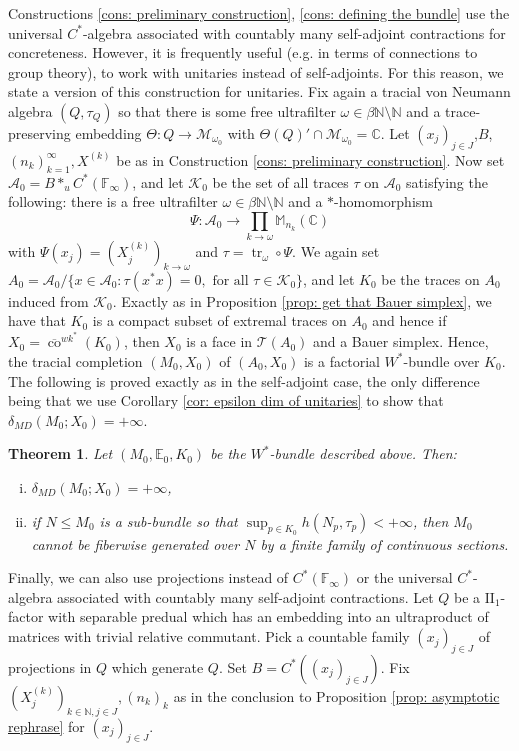 \documentclass[10pt]{amsart}
\newtheorem{thm}{Theorem}[section]
\theoremstyle{definition}
\numberwithin{equation}{section}
\newcommand{\bC}{{\mathbb C}}
\newcommand{\bE}{{\mathbb E}}
\newcommand{\bF}{{\mathbb F}}
\newcommand{\bM}{{\mathbb M}}
\newcommand{\bN}{{\mathbb N}}
\newcommand{\cA}{{\mathcal A}}
\newcommand{\cK}{{\mathcal K}}
\newcommand{\cM}{{\mathcal M}}
\newcommand{\cT}{{\mathcal T}}
\DeclareMathOperator{\tr}{tr}
\DeclareMathOperator{\co}{co}
\begin{document}
Constructions \ref{cons: preliminary construction}, \ref{cons: defining the bundle} use the universal $C^{*}$-algebra associated with countably many self-adjoint contractions for concreteness. However, it is frequently useful (e.g. in terms of connections to group theory), to work with unitaries instead of self-adjoints. For this reason, we state a version of this construction for unitaries. Fix again a tracial von Neumann algebra $(Q,\tau_{Q})$ so that there is some free ultrafilter $\omega\in \beta\bN\setminus\bN$ and a trace-preserving embedding $\Theta\colon Q\to\cM_{\omega_{0}}$ with $\Theta(Q)'\cap \cM_{\omega_{0}}=\bC$. Let $(x_{j})_{j\in J}$,$B$, $(n_{k})_{k=1}^{\infty},X^{(k)}$ be as in Construction \ref{cons: preliminary construction}. Now set $\cA_{0}=B*_{u}C^{*}(\bF_{\infty})$, and let $\cK_{0}$ be the set of all traces $\tau$ on $\cA_{0}$ satisfying the following: there is a free ultrafilter $\omega\in \beta\bN\setminus\bN$ and a $*$-homomorphism
\[\Psi\colon \cA_{0}\to \prod_{k\to\omega}\bM_{n_{k}}(\bC)\]
with $\Psi(x_{j})=(X_{j}^{(k)})_{k\to\omega}$ and $\tau=\tr_{\omega}\circ \Psi$. We again set $A_{0}=\cA_{0}/\{x\in \cA_{0}:\tau(x^{*}x)=0, \text{ for all $\tau\in \cK_{0}$}\}$, and let $K_{0}$ be the traces on $A_{0}$ induced from $\cK_{0}$. Exactly as in Proposition \ref{prop: get that Bauer simplex}, we have that $K_{0}$ is a compact subset of extremal traces on $A_{0}$ and hence if $X_{0}=\overline{\co}^{wk^{*}}(K_{0})$, then $X_{0}$ is a face in $\cT(A_{0})$ and a Bauer simplex. Hence, the tracial completion $(M_{0},X_{0})$ of $(A_{0},X_{0})$ is a factorial $W^{*}$-bundle over $K_{0}$. The following is proved exactly as in the self-adjoint case, the only difference being that we use Corollary \ref{cor: epsilon dim of unitaries} to show that $\delta_{MD}(M_{0};X_{0})=+\infty$.


\begin{thm}
Let $(M_{0},\bE_{0},K_{0})$ be the $W^{*}$-bundle described above. Then:
\begin{enumerate}[(i)]
    \item $\delta_{MD}(M_{0};X_{0})=+\infty$,
    \item if $N\leq M_{0}$ is a sub-bundle so that $\sup_{p\in K_{0}}h(N_{p},\tau_{p})<+\infty$, then $M_{0}$ cannot be fiberwise generated over $N$ by a finite family of continuous sections. 
\end{enumerate}
\end{thm}


Finally, we can also use projections instead of  $C^{*}(\bF_{\infty})$ or the universal $C^{*}$-algebra associated with countably many self-adjoint contractions. 
Let $Q$ be a $\textrm{II}_{1}$-factor with separable predual which has an embedding into an ultraproduct of matrices with trivial relative commutant. Pick a countable family $(x_{j})_{j\in J}$ of projections in $Q$ which generate $Q$. Set $B=C^{*}((x_{j})_{j\in J})$. 
Fix $(X_{j}^{(k)})_{k\in \bN,j\in J},(n_{k})_{k}$ as in the conclusion to Proposition \ref{prop: asymptotic rephrase} for $(x_{j})_{j\in J}$. 
\end{document}
